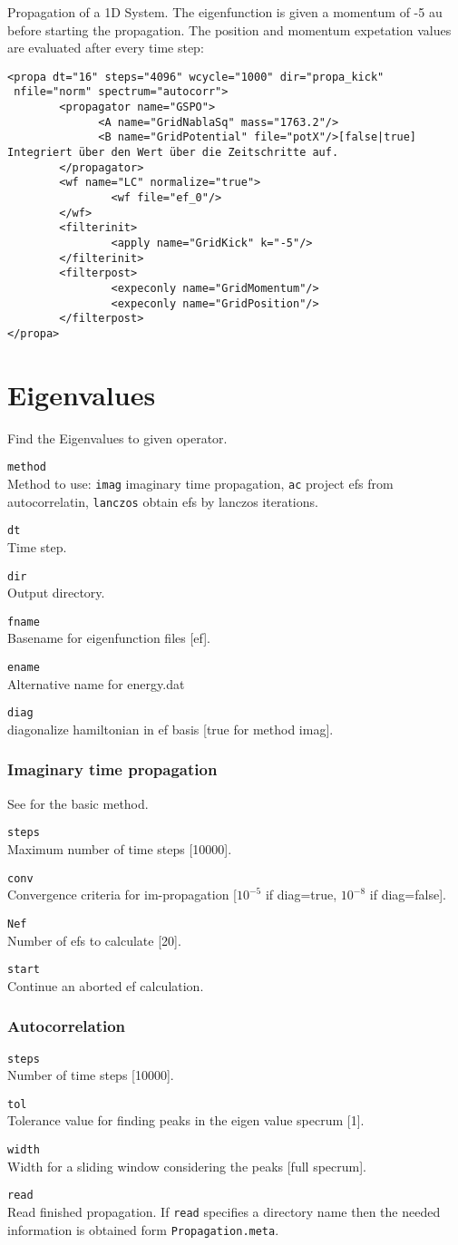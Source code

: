 \documentclass[a4paper,12pt]{scrbook}
\newcommand{\option}[2]{\item \texttt{#1}\\ #2}
\newcommand{\code}[1]{\texttt{#1}}
\begin{document}
Propagation of a 1D System. The eigenfunction is given a momentum of -5 au before starting the
propagation. The position and momentum expetation values are evaluated after every time step:
\begin{verbatim}
<propa dt="16" steps="4096" wcycle="1000" dir="propa_kick"
 nfile="norm" spectrum="autocorr">
        <propagator name="GSPO">
              <A name="GridNablaSq" mass="1763.2"/>
              <B name="GridPotential" file="potX"/>[false|true] Integriert über den Wert über die Zeitschritte auf.
        </propagator>
        <wf name="LC" normalize="true">
                <wf file="ef_0"/>
        </wf>
        <filterinit>
                <apply name="GridKick" k="-5"/>
        </filterinit>
        <filterpost>
                <expeconly name="GridMomentum"/>
                <expeconly name="GridPosition"/>
        </filterpost>
</propa> 
\end{verbatim}


\section{Eigenvalues}
Find the Eigenvalues to given operator.

\begin{options}
\option{method}{Method to use: \code{imag} imaginary time propagation, \code{ac} project efs from autocorrelatin, \code{lanczos} obtain efs by lanczos iterations.}
\option{dt}{Time step.}
\option{dir}{Output directory.}
\option{fname}{Basename for eigenfunction files [ef].}
\option{ename}{Alternative name for energy.dat}
\option{diag}{diagonalize hamiltonian in ef basis [true for method imag].}
\end{options}

\subsubsection*{Imaginary time propagation}
See \cite{Ezer86} for the basic method.
\begin{options}
\option{steps}{Maximum number of time steps [10000].}
\option{conv}{Convergence criteria for im-propagation [$10^{-5}$ if diag=true, $10^{-8}$ if diag=false].}
\option{Nef}{Number of efs to calculate [20].}
\option{start}{Continue an aborted ef calculation.}
\end{options}

\subsubsection*{Autocorrelation}
\begin{options}
\option{steps}{Number of time steps [10000].}
\option{tol}{Tolerance value for finding peaks in the eigen value specrum [1].}
\option{width}{Width for a sliding window considering the peaks [full specrum].}
\option{read}{Read finished propagation. If \code{read} specifies a directory name then the needed information is obtained form \code{Propagation.meta}.}
\end{options}
\end{document}
